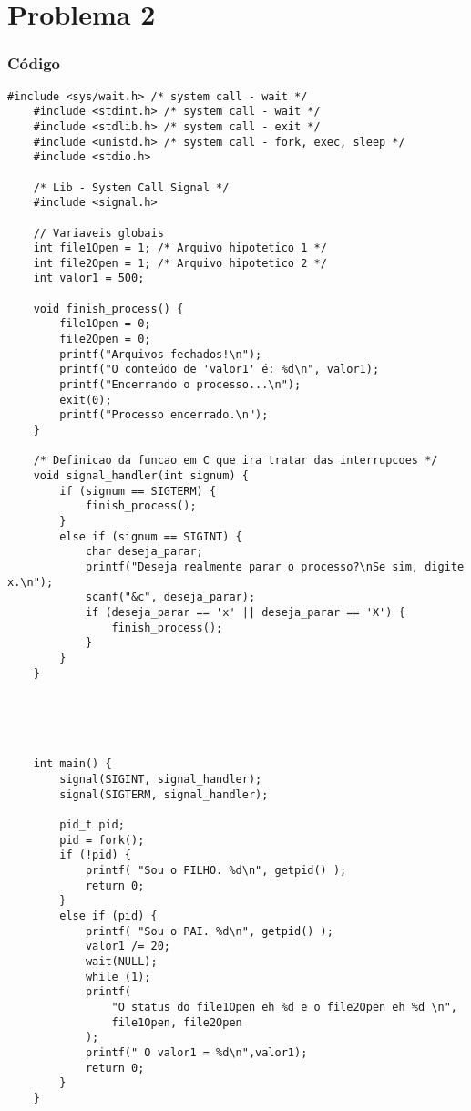 \chapter{Problema 2}

\subsection*{Código}


\begin{lstlisting}[style=CStyle]
    #include <sys/wait.h> /* system call - wait */
    #include <stdint.h> /* system call - wait */
    #include <stdlib.h> /* system call - exit */
    #include <unistd.h> /* system call - fork, exec, sleep */
    #include <stdio.h>
    
    /* Lib - System Call Signal */
    #include <signal.h>
    
    // Variaveis globais
    int file1Open = 1; /* Arquivo hipotetico 1 */
    int file2Open = 1; /* Arquivo hipotetico 2 */
    int valor1 = 500;
    
    void finish_process() {
        file1Open = 0;
        file2Open = 0;
        printf("Arquivos fechados!\n");
        printf("O conteúdo de 'valor1' é: %d\n", valor1);
        printf("Encerrando o processo...\n");
        exit(0);
        printf("Processo encerrado.\n");
    }
    
    /* Definicao da funcao em C que ira tratar das interrupcoes */
    void signal_handler(int signum) {
        if (signum == SIGTERM) {
            finish_process();
        }
        else if (signum == SIGINT) {
            char deseja_parar;
            printf("Deseja realmente parar o processo?\nSe sim, digite x.\n");
            scanf("&c", deseja_parar);
            if (deseja_parar == 'x' || deseja_parar == 'X') {
                finish_process();
            }
        } 
    }
    
    
    
    
    
    int main() {
        signal(SIGINT, signal_handler);
        signal(SIGTERM, signal_handler);
    
        pid_t pid;
        pid = fork();
        if (!pid) {
            printf( "Sou o FILHO. %d\n", getpid() );
            return 0;
        }
        else if (pid) {
            printf( "Sou o PAI. %d\n", getpid() );
            valor1 /= 20;
            wait(NULL);
            while (1);
            printf(
                "O status do file1Open eh %d e o file2Open eh %d \n", 
                file1Open, file2Open
            );
            printf(" O valor1 = %d\n",valor1);
            return 0;
        }
    }
    
\end{lstlisting}
